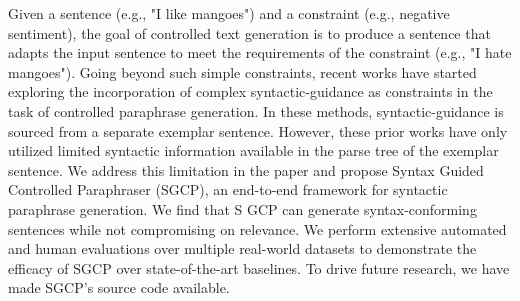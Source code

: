 Given a sentence (e.g., "I like mangoes") and a constraint (e.g., negative sentiment), the goal of controlled text generation is to produce a sentence that adapts the input sentence to meet the requirements of the constraint (e.g., "I hate mangoes"). Going beyond such simple constraints, recent works have started exploring the incorporation of complex syntactic-guidance as constraints in the task of controlled paraphrase generation. In these methods, syntactic-guidance is sourced from a separate exemplar sentence. However, these prior works have only utilized limited syntactic information available in the parse tree of the exemplar sentence. We address this limitation in the paper and propose Syntax Guided Controlled Paraphraser (SGCP), an end-to-end framework for syntactic paraphrase generation. We find that S GCP can generate syntax-conforming sentences while not compromising on relevance. We perform extensive automated and human evaluations over multiple real-world datasets to demonstrate the efficacy of SGCP over state-of-the-art baselines. To drive future research, we have made SGCP’s source code available.